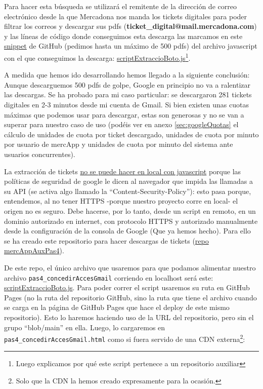 \documentclass[a4paper,12pt]{report}
\begin{document}
	
	Para hacer esta búsqueda se utilizará el remitente de la dirección  de correo electrónico desde la que  Mercadona nos manda los tickets digitales para poder filtrar los correos y descargar sus  pdfs (\textbf{ticket\_digital@mail.mercadona.com}) y las líneas de código donde conseguimos esta descarga las marcamos en este  \href{https://github.com/blackcub3s/mercAppAuxPas4/blob/e899ea50757bf3367c523f5a21d59f79bdb381ad/js/scriptExtraccioBoto.js#L89-L93}{snippet} de GitHub (pedimos hasta un máximo de 500 pdfs) del archivo javascript con el que conseguimos la descarga: \href{https://github.com/blackcub3s/mercAppAuxPas4/blob/main/js/scriptExtraccioBoto.js}{scriptExtraccioBoto.js}\footnote{Luego explicamos por qué este script pertenece a un repositorio auxiliar}.
	
	A medida que hemos ido desarrollando hemos llegado a la siguiente conclusión: Aunque descarguemos 500  pdfs de golpe, Google en principio no va a ralentizar las descargas. Se ha probado para mi caso particular: se descargaron 281 tickets digitales en 2-3 minutos desde mi cuenta de Gmail. Si bien existen unas cuotas máximas que podemos usar para descargar, estas son generosas y no se van a superar para nuestro caso de uso (podéis ver en anexo \ref{sec:googleQuotas} el cálculo de unidades de cuota por ticket descargado, unidades de cuota por minuto por usuario de mercApp y unidades de cuota por minuto del sistema ante usuarios concurrentes). 
	
	
	La extracción de tickets \underline{no se puede hacer en local con javascript} porque las políticas de seguridad de google le dicen al navegador que impida las llamadas a su API (se activa algo llamado la ``Content-Security-Policy''): esto pasa porque, entendemos, al no tener HTTPS -porque nuestro proyecto corre en local- el origen no es seguro. Debe hacerse, por lo tanto, desde un script en remoto, en un dominio autorizado en internet, con protocolo HTTPS y autorizado manualmente desde la configuración de la consola de Google (Que ya hemos hecho). Para ello se ha creado este repositorio para hacer descargas de tickets (\href{https://github.com/blackcub3s/mercAppAuxPas4/}{repo mercAppAuxPas4}).
	
	De este repo, el único archivo que usaremos para que podamos alimentar nuestro archivo \texttt{pas4\_concedirAccesGmail} corriendo en localhost será este: \href{https://github.com/blackcub3s/mercAppAuxPas4/blob/main/js/scriptExtraccioBoto.js}{scriptExtraccioBoto.js}. Para poder correr el script usaremos su ruta en GitHub Pages (no la ruta del repositorio GitHub, sino la ruta que tiene el archivo cuando se carga en la página de GitHub Pages que hace el deploy de este mismo repositorio). Esto lo haremos haciendo uso de la URL del repositorio, pero sin el grupo ``blob/main'' en ella. Luego, lo cargaremos en \texttt{pas4\_concedirAccesGmail.html} como si fuera servido de una CDN externa\footnote{Solo que la CDN la hemos creado expresamente para la ocasión.}:
	
\end{document}
